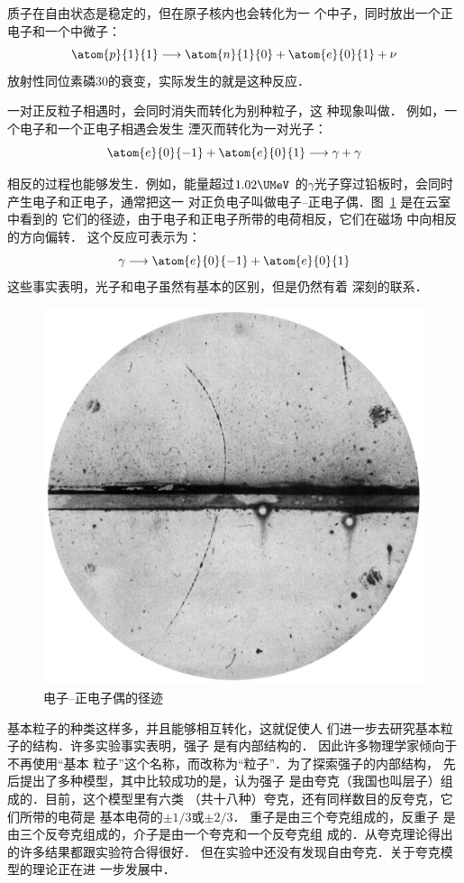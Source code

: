 质子在自由状态是稳定的，但在原子核内也会转化为一
个中子，同时放出一个正电子和一个中微子：
\[\atom{p}{1}{1}\longrightarrow \atom{n}{1}{0}+\atom{e}{0}{1}+\nu   \]
放射性同位素磷30的衰变，实际发生的就是这种反应．

一对正反粒子相遇时，会同时消失而转化为别种粒子，这
种现象叫做．
例如，一个电子和一个正电子相遇会发生
湮灭而转化为一对光子：
\[\atom{e}{0}{-1}+\atom{e}{0}{1}\longrightarrow \gamma+\gamma  \]

相反的过程也能够发生．例如，能量超过$1.02 \UMeV$
的$\gamma$光子穿过铅板时，会同时产生电子和正电子，通常把这一
对正负电子叫做电子--正电子偶．图~\ref{fig_C_9-16} 是在云室中看到的
它们的径迹，由于电子和正电子所带的电荷相反，它们在磁场
中向相反的方向偏转．
这个反应可表示为：
\[\gamma\longrightarrow \atom{e}{0}{-1}+\atom{e}{0}{1} \]
这些事实表明，光子和电子虽然有基本的区别，但是仍然有着
深刻的联系．
\begin{figure}[htbp]
    \centering
    \includegraphics{fig/C/9-16.jpg}
    \caption{电子--正电子偶的径迹}\label{fig_C_9-16}
\end{figure}



基本粒子的种类这样多，并且能够相互转化，这就促使人
们进一步去研究基本粒子的结构．许多实验事实表明，强子
是有内部结构的．
因此许多物理学家倾向于不再使用“基本
粒子”这个名称，而改称为“粒子”．为了探索强子的内部结构，
先后提出了多种模型，其中比较成功的是，认为强子
是由夸克（我国也叫层子）组成的．目前，这个模型里有六类
（共十八种）夸克，还有同样数目的反夸克，它们所带的电荷是
基本电荷的$\pm1/3$或$\pm 2/3$．
重子是由三个夸克组成的，反重子
是由三个反夸克组成的，介子是由一个夸克和一个反夸克组
成的．从夸克理论得出的许多结果都跟实验符合得很好．
但在实验中还没有发现自由夸克．关于夸克模型的理论正在进
一步发展中．

